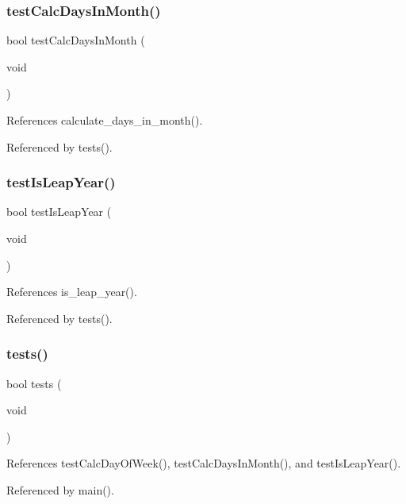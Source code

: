\subsubsection{test\+Calc\+Days\+In\+Month()}
{\footnotesize\ttfamily bool test\+Calc\+Days\+In\+Month (\begin{DoxyParamCaption}\item[{void}]{ }\end{DoxyParamCaption})}



References calculate\+\_\+days\+\_\+in\+\_\+month().



Referenced by tests().

\mbox{\label{tests_8c_a4b7126dd5f2bce3c1215754b4431dedc}} 
\subsubsection{test\+Is\+Leap\+Year()}
{\footnotesize\ttfamily bool test\+Is\+Leap\+Year (\begin{DoxyParamCaption}\item[{void}]{ }\end{DoxyParamCaption})}



References is\+\_\+leap\+\_\+year().



Referenced by tests().

\mbox{\label{tests_8c_a5e6e6e78df62797046c9ea173550a68a}} 
\subsubsection{tests()}
{\footnotesize\ttfamily bool tests (\begin{DoxyParamCaption}\item[{void}]{ }\end{DoxyParamCaption})}



References test\+Calc\+Day\+Of\+Week(), test\+Calc\+Days\+In\+Month(), and test\+Is\+Leap\+Year().



Referenced by main().


